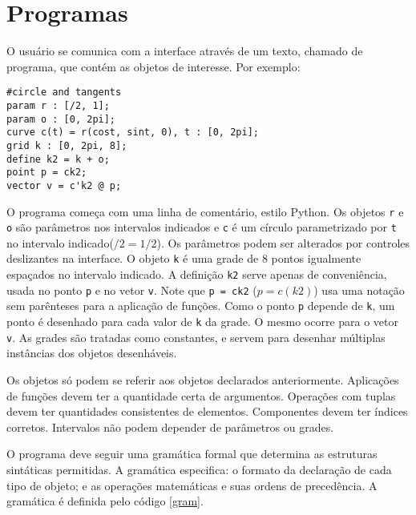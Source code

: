 \chapter{Programas}

O usuário se comunica com a interface através de um texto, chamado de programa, que contém as objetos de interesse.
Por exemplo:
\begin{lstlisting}[caption=Exemplo de objetos,label=code1]
#circle and tangents
param r : [/2, 1];
param o : [0, 2pi];
curve c(t) = r(cost, sint, 0), t : [0, 2pi];
grid k : [0, 2pi, 8];
define k2 = k + o;
point p = ck2;
vector v = c'k2 @ p;
\end{lstlisting}

O programa começa com uma linha de comentário, estilo Python.
Os objetos \texttt{r} e \texttt{o} são parâmetros nos intervalos indicados e \texttt{c} é um círculo
parametrizado por \texttt{t} no intervalo indicado($/2 = 1/2$).
Os parâmetros podem ser alterados por controles deslizantes na interface.
O objeto \texttt{k} é uma grade de 8 pontos igualmente espaçados no intervalo indicado.
A definição \texttt{k2} serve apenas de conveniência, usada no ponto \texttt{p} e no vetor \texttt{v}.
Note que \texttt{p = ck2} ($p = c(k2)$) usa uma notação sem parênteses para a aplicação de funções.
Como o ponto \texttt{p} depende de \texttt{k}, 
um ponto é desenhado para cada valor de \texttt{k} da grade.
O mesmo ocorre para o vetor \texttt{v}. As grades são tratadas como constantes,
e servem para desenhar múltiplas instâncias dos objetos desenháveis.

Os objetos só podem se referir aos objetos declarados anteriormente.
Aplicações de funções devem ter a quantidade certa de argumentos.
Operações com tuplas devem ter quantidades consistentes de elementos.
Componentes devem ter índices corretos.
Intervalos não podem depender de parâmetros ou grades.


O programa deve seguir uma gramática formal que determina as estruturas sintáticas permitidas.
A gramática especifica: o formato da declaração de cada tipo de objeto;
e as operações matemáticas e suas ordens de precedência.
A gramática é definida pelo código \ref{gram}.

